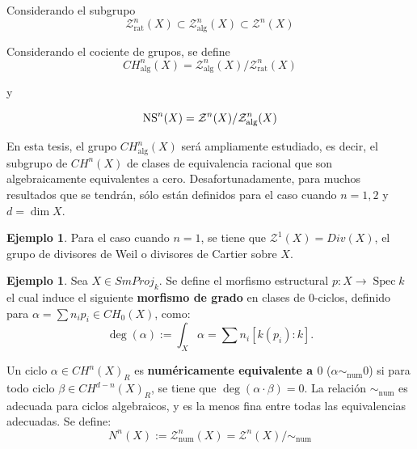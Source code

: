 \documentclass[10pt]{amsart}
\theoremstyle{definition}
\theoremstyle{remark}
\theoremstyle{definition}
\newtheorem{ejem}[definition]{Ejemplo}
\begin{document}
Considerando el subgrupo
\begin{equation*}
\mathcal{Z}^{n}_{\mathrm{rat}}(X) \subset \mathcal{Z}^{n}_{\mathrm{alg}}(X) \subset \mathcal{Z}^{n}(X)
\end{equation*}

Considerando el cociente de grupos, se define
\begin{equation*}
CH^{n}_{\mathrm{alg}}(X)=\mathcal{Z}^{n}_{\mathrm{alg}}(X)/\mathcal{Z}^{n}_{\mathrm{rat}}(X)
\end{equation*} 

y 

\begin{equation*}
{\rm NS}^{n}(X)=\mathcal{Z}^{n}(X)/\mathcal{Z}^{n}_{\mathrm{alg}}(X)
\end{equation*}

En esta tesis, el grupo $CH^{n}_{\mathrm{alg}}(X)$ será ampliamente estudiado, es decir, el subgrupo de $CH^{n}(X)$ de clases de equivalencia racional que son algebraicamente equivalentes a cero. Desafortunadamente, para muchos resultados que se tendrán, sólo están definidos para el caso cuando $n=1,2$ y $d=\dim X$.

\begin{ejem}
Para el caso cuando $n=1$, se tiene que $\mathcal{Z}^{1}(X)=Div(X)$, el grupo de divisores de Weil o divisores de Cartier sobre $X$. 
\end{ejem}

\begin{ejem}
Sea $X \in SmProj_{\mathit{k}}$. Se define el morfismo estructural $p: X \rightarrow \operatorname{Spec}{\mathit{k}}$ el cual induce el siguiente \textbf{morfismo de grado} en clases de $0$-ciclos, definido para $\alpha=\sum n_{i}p_{i} \in CH_{0}(X)$, como:
\begin{equation*}
\deg(\alpha):=\int_{X} \alpha = \sum n_{i}[\mathit{k}(p_{i}):\mathit{k}].
\end{equation*}
\end{ejem} 

Un ciclo $\alpha \in CH^{n}(X)_{R}$ es \textbf{numéricamente equivalente a $0$} ($\alpha \sim_{\mathrm{num}} 0$) si para todo ciclo $\beta \in CH^{d-n}(X)_{R}$, se tiene que $\deg(\alpha \cdot \beta)=0$. La relación $\sim_{\mathrm{num}}$ es adecuada para ciclos algebraicos, y es la menos fina entre todas las equivalencias adecuadas. Se define:
\begin{equation*}
N^{n}(X):=\mathcal{Z}^{n}_{\mathrm{num}}(X)=\mathcal{Z}^{n}(X)/\sim_{\mathrm{num}}
\end{equation*}
\end{document}

